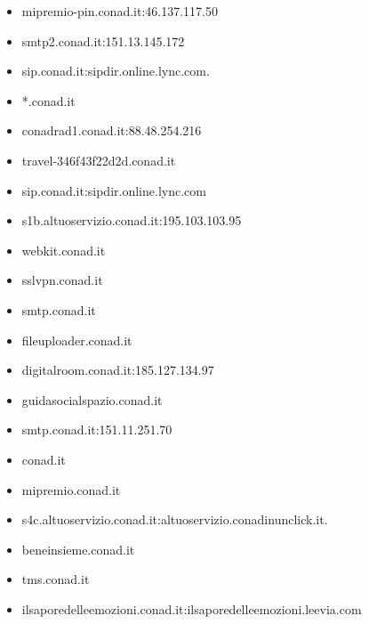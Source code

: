 \documentclass{article}
\begin{document}
\begin{itemize}
        \item mipremio-pin.conad.it:46.137.117.50
    
        \item smtp2.conad.it:151.13.145.172
    
        \item sip.conad.it:sipdir.online.lync.com.
    
        \item *.conad.it
    
        \item conadrad1.conad.it:88.48.254.216
    
        \item travel-346f43f22d2d.conad.it
    
        \item sip.conad.it:sipdir.online.lync.com
    
        \item s1b.altuoservizio.conad.it:195.103.103.95
    
        \item webkit.conad.it
    
        \item sslvpn.conad.it
    
        \item smtp.conad.it
    
        \item fileuploader.conad.it
    
        \item digitalroom.conad.it:185.127.134.97
    
        \item guidasocialspazio.conad.it
    
        \item smtp.conad.it:151.11.251.70
    
        \item conad.it
    
        \item mipremio.conad.it
    
        \item s4c.altuoservizio.conad.it:altuoservizio.conadinunclick.it.
    
        \item beneinsieme.conad.it
    
        \item tms.conad.it
    
        \item ilsaporedelleemozioni.conad.it:ilsaporedelleemozioni.leevia.com
    

\end{itemize}
\end{document}
